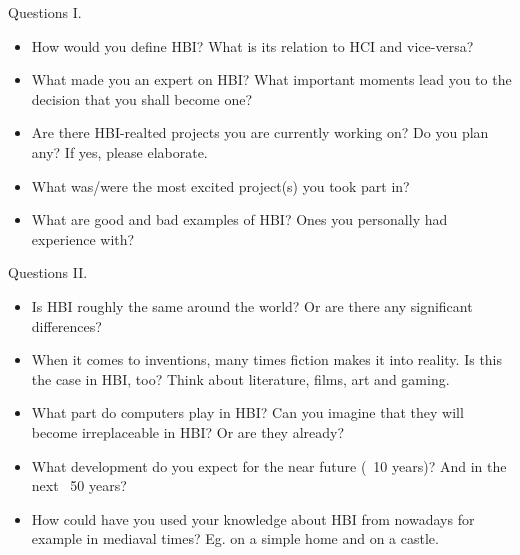 \documentclass[10pt]{beamer}
\begin{document}
\begin{frame}{Questions I.}
	\begin{itemize}
        \pause{}
		\item How would you define HBI? What is its relation to HCI and vice-versa?
		\pause{}
		\item What made you an expert on HBI? What important moments lead you to the decision that you shall become one?
		\pause{}
		\item Are there HBI-realted projects you are currently working on? Do you plan any? If yes, please elaborate.
		\pause{}
		\item What was/were the most excited project(s) you took part in?
		\pause{}
		\item What are good and bad examples of HBI? Ones you personally had experience with?
	\end{itemize}	
\end{frame}


\begin{frame}{Questions II.}
	\begin{itemize}
        \pause{}
		\item Is HBI roughly the same around the world? Or are there any significant differences?
		\pause{}
		\item When it comes to inventions, many times fiction makes it into reality. Is this the case in HBI, too? Think about literature, films, art and gaming.
		\pause{}
		\item What part do computers play in HBI? Can you imagine that they will become irreplaceable in HBI? Or are they already?
		\pause{}
		\item What development do you expect for the near future (~10 years)? And in the next ~50 years?
		\pause{}
		\item How could have you used your knowledge about HBI from nowadays for example in mediaval times? Eg. on a simple home and on a castle.
	\end{itemize}	
\end{frame}

\end{document}
